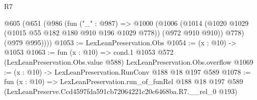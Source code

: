 \begin{lexlean}{R7}
\begin{coremodule}
  @605
    (@651
      (@986
        (fun ("_" : @987) =>
        @1000
          (@1006
            (@1014 (@1020 @1029 (@1015 @55 @182 @180 @910 @196 @1029 @778)) (@972 @910 @910))
            @778)
          (@979 @995))))
@1053 := LexLeanPreservation.Obs
@1054 := (x : @10) -> @1053
@1063 := fun (x : @10) =>
  cond.{1} @1053 @572 (LexLeanPreservation.Obs.value @588) LexLeanPreservation.Obs.overflow
@1069 := (x : @10) -> LexLeanPreservation.RunConv @188 @18 @197 @589
@1078 := fun (x : @10) =>
  LexLeanPreservation.run_of_funRel
    @188
    @18
    @197
    @589
    (LexLeanPreserve.Ccd4597fda591cb72064221c20c6468ba.R7.__rel_0 @193)
\end{coremodule}
\end{lexlean}
